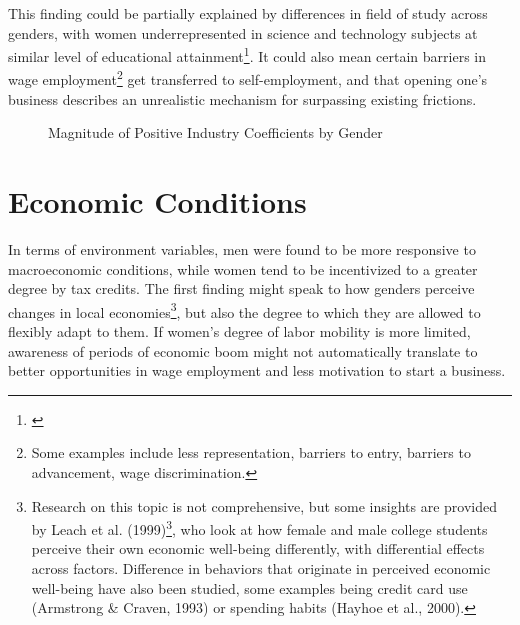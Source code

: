 This finding could be partially explained by differences in field of study across genders, with women underrepresented in science and technology subjects at similar level of educational attainment\footnote{\cite{olivetti2016dp11034}}. It could also mean certain barriers in wage employment\footnote{Some examples include less representation, barriers to entry, barriers to advancement, wage discrimination.} get transferred to self-employment, and that opening one's business describes an unrealistic mechanism for surpassing existing frictions. 

\begin{figure}[hbtp]
    \caption{Magnitude of Positive Industry Coefficients by Gender} 
\end{figure}

\section{Economic Conditions}

In terms of environment variables, men were found to be more responsive to macroeconomic conditions, while women tend to be incentivized to a greater degree by tax credits. The first finding might speak to how genders perceive changes in local economies\footnote{Research on this topic is not comprehensive, but some insights are provided by Leach et al. (1999)\footnote{\cite{LeachHayhoeTurner1999}}, who look at how female and male college students perceive their own economic well-being differently, with differential effects across factors. Difference in behaviors that originate in perceived economic well-being have also been studied, some examples being credit card use (Armstrong & Craven, 1993) or spending habits (Hayhoe et al., 2000).}, but also the degree to which they are allowed to flexibly adapt to them. If women's degree of labor mobility is more limited, awareness of periods of economic boom might not automatically translate to better opportunities in wage employment and less motivation to start a business. 

